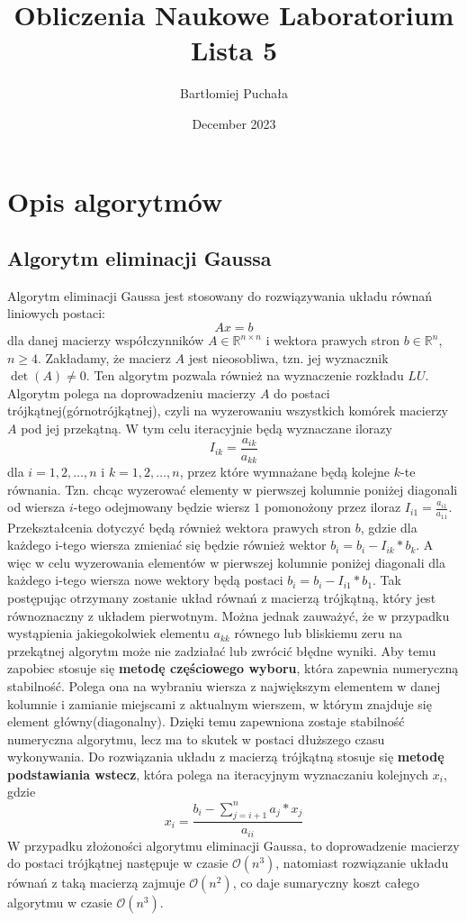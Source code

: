 \documentclass{article}
\title{Obliczenia Naukowe Laboratorium Lista 5}
\author{Bartłomiej Puchała}
\date{December 2023}
\begin{document}
\maketitle

\section{Opis algorytmów}
\subsection{Algorytm eliminacji Gaussa}
Algorytm eliminacji Gaussa jest stosowany do rozwiązywania układu równań liniowych postaci: 
$$ Ax = b $$
dla danej macierzy współczynników $A \in \mathbb{R}^{n \times n}$ i wektora prawych stron $b \in \mathbb{R}^{n}$, $n \geq 4$. Zakładamy, że macierz $A$ jest nieosobliwa, tzn. jej wyznacznik $ \det(A) \neq 0$. Ten algorytm pozwala również na wyznaczenie rozkładu $LU$. Algorytm polega na doprowadzeniu macierzy $A$ do postaci trójkątnej(górnotrójkątnej), czyli na wyzerowaniu wszystkich komórek macierzy $A$ pod jej przekątną. W tym celu iteracyjnie będą wyznaczane ilorazy 
$$ I_{ik} = \frac{a_{ik}}{a_{kk}} $$ dla $ i = 1,2, \dots, n$ i $k = 1,2, \dots,n$, przez które wymnażane będą kolejne $k$-te równania. Tzn. chcąc wyzerować elementy w pierwszej kolumnie poniżej diagonali od wiersza $i$-tego odejmowany będzie wiersz $1$ pomonożony przez iloraz $I_{i1} = \frac{a_{i1}}{a_{11}}$. Przekształcenia dotyczyć będą również wektora prawych stron $b$, gdzie dla każdego i-tego wiersza zmieniać się będzie również wektor $b_i = b_i - I_{ik} * b_k$. A więc w celu wyzerowania elementów w pierwszej kolumnie poniżej diagonali dla każdego i-tego wiersza nowe wektory będą postaci $b_i = b_i - I_{i1} * b_1 $. Tak postępując otrzymany zostanie układ równań z macierzą trójkątną, który jest równoznaczny z układem pierwotnym. Można jednak zauważyć, że w przypadku wystąpienia jakiegokolwiek elementu $a_{kk}$ równego lub bliskiemu zeru na przekątnej algorytm może nie zadziałać lub zwrócić błędne wyniki. Aby temu zapobiec stosuje się 
\textbf{metodę częściowego wyboru}, która zapewnia numeryczną stabilność. Polega ona na wybraniu wiersza z największym elementem w danej kolumnie i zamianie miejscami z aktualnym wierszem, w którym znajduje się element główny(diagonalny). Dzięki temu zapewniona zostaje stabilność numeryczna algorytmu, lecz ma to skutek w postaci dłuższego czasu wykonywania. 
Do rozwiązania układu z macierzą trójkątną stosuje się \textbf{metodę podstawiania wstecz}, która polega na iteracyjnym wyznaczaniu kolejnych $x_i$, gdzie 
$$ x_i = \frac{b_i - \sum_{j=i+1}^{n} a_{j}*x_j }{a_{ii}} $$
W przypadku złożoności algorytmu eliminacji Gaussa, to doprowadzenie macierzy do postaci trójkątnej następuje w czasie $\mathcal{O}(n^3)$, natomiast rozwiązanie układu równań z taką macierzą zajmuje $\mathcal{O}(n^2)$, co daje sumaryczny koszt całego algorytmu w czasie $\mathcal{O}(n^3)$.
\end{document}
